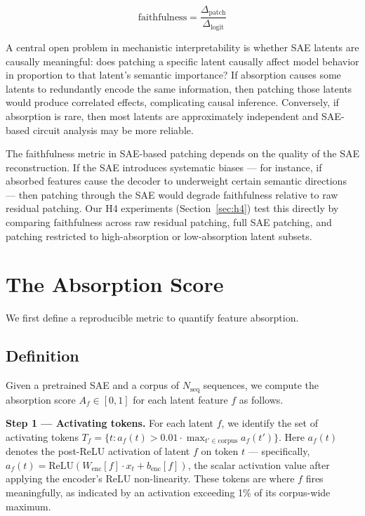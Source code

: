 \documentclass{article}
\begin{document}
\begin{equation}
\text{faithfulness} = \frac{\Delta_{\text{patch}}}{\Delta_{\text{logit}}}
\end{equation}

A central open problem in mechanistic interpretability is whether SAE latents are causally meaningful: does patching a specific latent causally affect model behavior in proportion to that latent's semantic importance? If absorption causes some latents to redundantly encode the same information, then patching those latents would produce correlated effects, complicating causal inference. Conversely, if absorption is rare, then most latents are approximately independent and SAE-based circuit analysis may be more reliable.

The faithfulness metric in SAE-based patching depends on the quality of the SAE reconstruction. If the SAE introduces systematic biases --- for instance, if absorbed features cause the decoder to underweight certain semantic directions --- then patching through the SAE would degrade faithfulness relative to raw residual patching. Our H4 experiments (Section~\ref{sec:h4}) test this directly by comparing faithfulness across raw residual patching, full SAE patching, and patching restricted to high-absorption or low-absorption latent subsets.

\section{The Absorption Score}
\label{sec:absorption_score}

We first define a reproducible metric to quantify feature absorption.

\subsection{Definition}

Given a pretrained SAE and a corpus of $N_{\text{seq}}$ sequences, we compute the absorption score $A_f \in [0, 1]$ for each latent feature $f$ as follows.

\textbf{Step 1 --- Activating tokens.} For each latent $f$, we identify the set of activating tokens $T_f = \{t : a_f(t) > 0.01 \cdot \max_{t' \in \text{corpus}} a_f(t')\}$. Here $a_f(t)$ denotes the post-ReLU activation of latent $f$ on token $t$ --- specifically, $a_f(t) = \text{ReLU}(W_{\text{enc}}[f] \cdot x_t + b_{\text{enc}}[f])$, the scalar activation value after applying the encoder's ReLU non-linearity. These tokens are where $f$ fires meaningfully, as indicated by an activation exceeding 1\% of its corpus-wide maximum.
\end{document}
